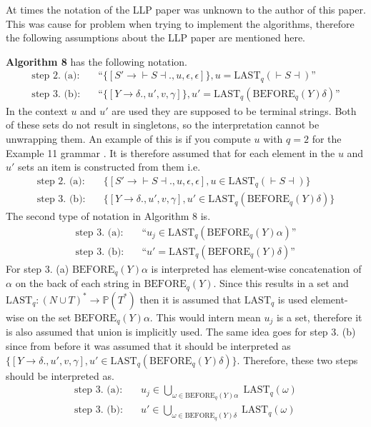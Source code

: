 At times the notation of the LLP paper \cite{Vagner2007} was unknown to the author of this paper. This was cause for problem when trying to implement the algorithms, therefore the following assumptions about the LLP paper \cite{Vagner2007} are mentioned here.

\textbf{Algorithm 8} \cite[13]{Vagner2007} has the following notation.
\begin{align*}
    \text{step 2. (a):}& \quad \text{``}\{[S' \to \vdash S \dashv \textbf{.}, u, \epsilon, \epsilon]\}, u = \text{LAST}_q(\vdash S \dashv)\text{''} \\
    \text{step 3. (b):}& \quad \text{``}\{[Y \to \delta \textbf{.}, u', v, \gamma]\}, u' = \text{LAST}_q(\text{BEFORE}_q(Y)\delta)\text{''}
\end{align*}    
In the context $u$ and $u'$ are used they are supposed to be terminal strings. Both of these sets do not result in singletons, so the interpretation cannot be unwrapping them. An example of this is if you compute $u$ with $q=2$ for the Example 11 grammar \cite[14]{Vagner2007}. It is therefore assumed that for each element in the $u$ and $u'$ sets an item is constructed from them i.e.
\begin{align*}
    \text{step 2. (a):}& \quad \{[S' \to \vdash S \dashv \textbf{.}, u, \epsilon, \epsilon], u \in \text{LAST}_q(\vdash S \dashv)\} \\
    \text{step 3. (b):}& \quad \{[Y \to \delta \textbf{.}, u', v, \gamma], u' \in \text{LAST}_q(\text{BEFORE}_q(Y)\delta)\}
\end{align*}
The second type of notation in Algorithm 8 is.
\begin{align*}
    \text{step 3. (a):}& \quad \text{``} u_j \in \text{LAST}_q(\text{BEFORE}_q(Y) \alpha)\text{''} \\
    \text{step 3. (b):}& \quad \text{``} u' = \text{LAST}_q(\text{BEFORE}_q(Y)\delta)\text{''}
\end{align*}    
For step 3. (a) $\text{BEFORE}_q(Y) \alpha$ is interpreted has element-wise concatenation of $\alpha$ on the back of each string in $\text{BEFORE}_q(Y)$. Since this results in a set and $\text{LAST}_q: (N \cup T)^* \to \mathbb{P}(T^*)$ then it is assumed that $\text{LAST}_q$ is used element-wise on the set $\text{BEFORE}_q(Y) \alpha$. This would intern mean $u_j$ is a set, therefore it is also assumed that union is implicitly used. The same idea goes for step 3. (b) since from before it was assumed that it should be interpreted as $\{[Y \to \delta \textbf{.}, u', v, \gamma], u' \in \text{LAST}_q(\text{BEFORE}_q(Y)\delta)\}$. Therefore, these two steps should be interpreted as.
\begin{align*}
    \text{step 3. (a):}& \quad u_j \in \text{$\bigcup$}_{\omega \in \text{BEFORE}_q(Y) \alpha} \; \text{LAST}_q(\omega) \\
    \text{step 3. (b):}& \quad  u' \in \text{$\bigcup$}_{\omega \in \text{BEFORE}_q(Y) \delta} \; \text{LAST}_q(\omega)
\end{align*}